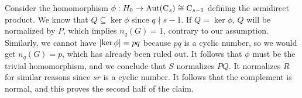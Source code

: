 Consider the homomorphism $\phi : H_0 \to \operatorname{Aut}(\operatorname{C}_{s}) \cong \operatorname{C}_{s - 1}$ defining the semidirect product.
We know that $Q \subseteq \ker \phi$ since $q \nmid s - 1$.
If $Q = \ker \phi$, $Q$ will be normalized by $P$, which implies $n_q(G) = 1$, contrary to our assumption.
Similarly, we cannot have $\lvert\ker \phi\rvert = pq$ because $pq$ is a cyclic number, so we would get $n_q(G) = p$, which has already been ruled out.
It follows that $\phi$ must be the trivial homomorphism, and we conclude that $S$ normalizes $PQ$.
It normalizes $R$ for similar reasons since $sr$ is a cyclic number.
 It follows that the complement is normal, and this proves the second half of the claim.
